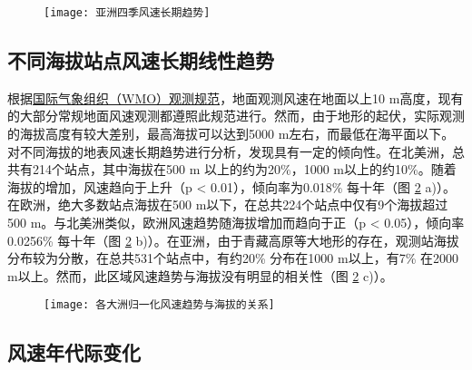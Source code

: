 \begin{figure}[!htbp]
    \centering
    \texttt{[image: 亚洲四季风速长期趋势]}
    \label{fig:ASwindtrend}
\end{figure}

\subsection{不同海拔站点风速长期线性趋势}

根据\href{https://community.wmo.int/activity-areas/imop/cimo-guide/cimo-guide-preliminary-2018-edition}{国际气象组织（WMO）观测规范}，地面观测风速在地面以上10 m高度，现有的大部分常规地面风速观测都遵照此规范进行。然而，由于地形的起伏，实际观测的海拔高度有较大差别，最高海拔可以达到5000 m左右，而最低在海平面以下。对不同海拔的地表风速长期趋势进行分析，发现具有一定的倾向性。在北美洲，总共有214个站点，其中海拔在500 m 以上的约为20\%，1000 m以上的约10\%。随着海拔的增加，风速趋向于上升（p < 0.01），倾向率为0.018\% 每十年（图 \ref{fig:regionalwindvselevation} a)）。在欧洲，绝大多数站点海拔在500 m以下，在总共224个站点中仅有9个海拔超过500 m。与北美洲类似，欧洲风速趋势随海拔增加而趋向于正（p < 0.05），倾向率0.0256\% 每十年（图 \ref{fig:regionalwindvselevation} b)）。在亚洲，由于青藏高原等大地形的存在，观测站海拔分布较为分散，在总共531个站点中，有约20\% 分布在1000 m以上，有7\% 在2000 m以上。然而，此区域风速趋势与海拔没有明显的相关性（图 \ref{fig:regionalwindvselevation} c)）。

\begin{figure}[!htbp]
    \centering
    \texttt{[image: 各大洲归一化风速趋势与海拔的关系]}
    \label{fig:regionalwindvselevation}
\end{figure}

\subsection{风速年代际变化}

